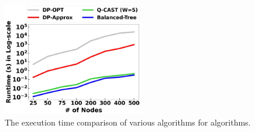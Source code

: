 \begin{figure}
    \centering
    \includegraphics[width=0.55\textwidth]{chapters/swappingtrees/figures/runtime-sp.png}
    \caption{The execution time comparison of various algorithms for \spp algorithms.}
    \label{fig:swapping_runtime}
\end{figure}




    


